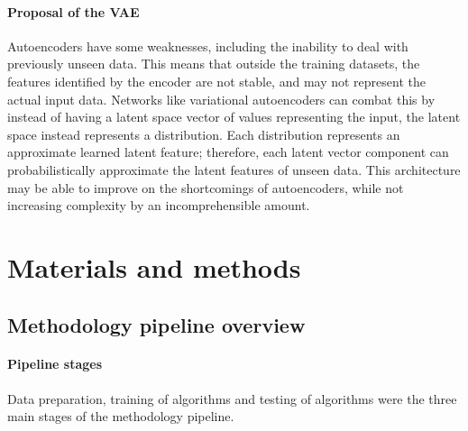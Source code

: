 \documentclass[review]{elsarticle}
\begin{document}

\paragraph{Proposal of the VAE} Autoencoders have some weaknesses, including the inability to deal with previously unseen data. This means that outside the training datasets, the features identified by the encoder are not stable, and may not represent the actual input data. Networks like variational autoencoders can combat this by instead of having a latent space vector of values representing the input, the latent space instead represents a distribution. Each distribution represents an approximate learned latent feature; therefore, each latent vector component can probabilistically approximate the latent features of unseen data.
This architecture may be able to improve on the shortcomings of autoencoders, while not increasing complexity by an incomprehensible amount.

\section{Materials and methods}
\subsection{Methodology pipeline overview}
\paragraph{Pipeline stages} Data preparation, training of algorithms and testing of algorithms were the three main stages of the methodology pipeline.

\end{document}
